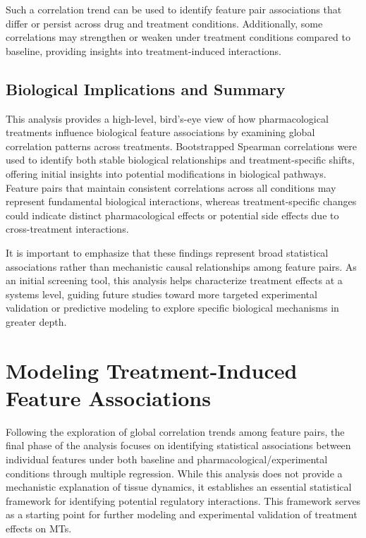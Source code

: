\documentclass{report}
\begin{document}
    Such a correlation trend can be used to identify feature pair associations that differ or persist across drug and treatment conditions. Additionally, some correlations may strengthen or weaken under treatment conditions compared to baseline, providing insights into treatment-induced interactions.


    
    \subsection{Biological Implications and Summary}
    This analysis provides a high-level, bird's-eye view of how pharmacological treatments influence biological feature associations by examining global correlation patterns across treatments. Bootstrapped Spearman correlations were used to identify both stable biological relationships and treatment-specific shifts, offering initial insights into potential modifications in biological pathways. Feature pairs that maintain consistent correlations across all conditions may represent fundamental biological interactions, whereas treatment-specific changes could indicate distinct pharmacological effects or potential side effects due to cross-treatment interactions.
    
    It is important to emphasize that these findings represent broad statistical associations rather than mechanistic causal relationships among feature pairs. As an initial screening tool, this analysis helps characterize treatment effects at a systems level, guiding future studies toward more targeted experimental validation or predictive modeling to explore specific biological mechanisms in greater depth.
    
\newpage
\section {Modeling Treatment-Induced Feature Associations} 
\label{regression-feature-associations}
    Following the exploration of global correlation trends among feature pairs, the final phase of the analysis focuses on identifying statistical associations between individual features under both baseline and pharmacological/experimental conditions through multiple regression. While this analysis does not provide a mechanistic explanation of tissue dynamics, it establishes an essential statistical framework for identifying potential regulatory interactions. This framework serves as a starting point for further modeling and experimental validation of treatment effects on MTs.
\end{document}

